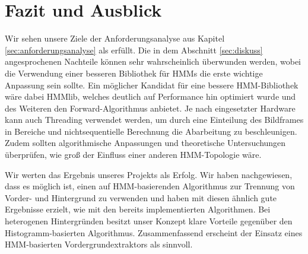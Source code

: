 \section{Fazit und Ausblick}
\label{chap:fazit}

Wir sehen unsere Ziele der Anforderungsanalyse aus Kapitel \ref{sec:anforderungsanalyse} als erfüllt. Die in dem Abschnitt \ref{sec:diskuss} angesprochenen Nachteile können sehr wahrscheinlich überwunden werden, wobei die Verwendung einer besseren Bibliothek für HMMs die erste wichtige Anpassung sein sollte. Ein möglicher Kandidat für eine bessere HMM-Bibliothek wäre dabei HMMlib, welches deutlich auf Performance hin optimiert wurde und des Weiteren den Forward-Algorithmus anbietet. Je nach eingesetzter Hardware kann auch Threading verwendet werden, um durch eine Einteilung des Bildframes in Bereiche und nichtsequentielle Berechnung die Abarbeitung zu beschleunigen. Zudem sollten algorithmische Anpassungen und theoretische Untersuchungen überprüfen, wie groß der Einfluss einer anderen HMM-Topologie wäre.


Wir werten das Ergebnis unseres Projekts als Erfolg. Wir haben nachgewiesen, dass es möglich ist, einen auf HMM-basierenden Algorithmus zur Trennung von Vorder- und Hintergrund zu verwenden und haben mit diesen ähnlich gute Ergebnisse erzielt, wie mit den bereits implementierten Algorithmen. Bei heterogenen Hintergründen besitzt unser Konzept klare Vorteile gegenüber den Histogramm-basierten Algorithmus. Zusammenfassend erscheint der Einsatz eines HMM-basierten Vordergrundextraktors als sinnvoll.





